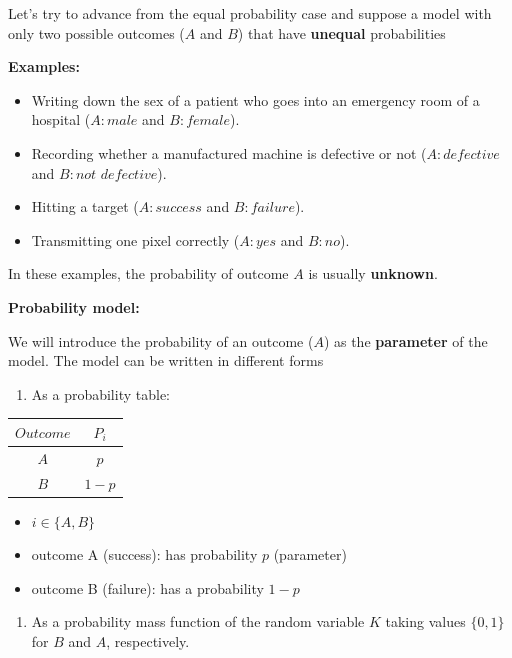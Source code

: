 \documentclass[
]{book}
\providecommand{\tightlist}{%
  \setlength{\itemsep}{0pt}\setlength{\parskip}{0pt}}
\begin{document}
Let's try to advance from the equal probability case and suppose a model with only two possible outcomes (\(A\) and \(B\)) that have \textbf{unequal} probabilities

\textbf{Examples:}

\begin{itemize}
\item
  Writing down the sex of a patient who goes into an emergency room of a hospital (\(A:male\) and \(B:female\)).
\item
  Recording whether a manufactured machine is defective or not (\(A:defective\) and \(B:not \,\, defective\)).
\item
  Hitting a target (\(A:success\) and \(B:failure\)).
\item
  Transmitting one pixel correctly (\(A:yes\) and \(B:no\)).
\end{itemize}

In these examples, the probability of outcome \(A\) is usually \textbf{unknown}.

\textbf{Probability model:}

We will introduce the probability of an outcome (\(A\)) as the \textbf{parameter} of the model. The model can be written in different forms

\begin{enumerate}
\def\labelenumi{\arabic{enumi})}
\tightlist
\item
  As a probability table:
\end{enumerate}

\begin{longtable}[]{@{}cc@{}}
\toprule
\(Outcome\) & \(P_i\) \\
\midrule
\endhead
\(A\) & \(p\) \\
\(B\) & \(1-p\) \\
\bottomrule
\end{longtable}

\begin{itemize}
\tightlist
\item
  \(i \in \{A,B\}\)
\item
  outcome A (success): has probability \(p\) (parameter)
\item
  outcome B (failure): has a probability \(1-p\)
\end{itemize}

\begin{enumerate}
\def\labelenumi{\arabic{enumi})}
\setcounter{enumi}{1}
\tightlist
\item
  As a probability mass function of the random variable \(K\) taking values \(\{0, 1\}\) for \(B\) and \(A\), respectively.
\end{enumerate}
\end{document}
